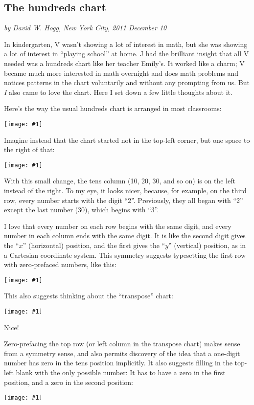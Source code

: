 \documentclass[12pt,pdftex]{article}
\newcommand{\showchart}[1]{\texttt{[image: \#1]}}
\begin{document}
\subsection*{The hundreds chart}

\noindent
\textsl{by David W. Hogg, New York City, 2011 December 10}
\vspace{1ex}

In kindergarten, V wasn't showing a lot of interest in math, but she
was showing a lot of interest in ``playing school'' at home.  J had
the brilliant insight that all V needed was a hundreds chart like her
teacher Emily's.  It worked like a charm; V became much more
interested in math overnight and does math problems and notices
patterns in the chart voluntarily and without any prompting from us.
But \emph{I} also came to love the chart.  Here I set down a few
little thoughts about it.

Here's the way the usual hundreds chart is arranged in most
classrooms:
\begin{center}
\showchart{hundreds_chart_standard.pdf}
\end{center}

Imagine instead that the chart started not in the top-left corner,
but one space to the right of that:
\begin{center}
\showchart{hundreds_chart_skipzero_nzp.pdf}
\end{center}
With this small change, the tens column (10, 20, 30, and so on) is on
the left instead of the right.  To my eye, it looks nicer, because,
for example, on the third row, every number starts with the digit
``2''.  Previously, they all began with ``2'' except the last number
(30), which begins with ``3''.

I love that every number on each row begins with the same digit, and
every number in each column ends with the same digit.  It is like the
second digit gives the ``$x$'' (horizontal) position, and the first
gives the ``$y$'' (vertical) position, as in a Cartesian coordinate
system.  This symmetry suggests typesetting the first row with
zero-prefaced numbers, like this:
\begin{center}
\showchart{hundreds_chart_skipzero.pdf}
\end{center}
This also suggests thinking about the ``transpose'' chart:
\begin{center}
\showchart{hundreds_chart_transpose_skipzero.pdf}
\end{center}
Nice!

Zero-prefacing the top row (or left column in the transpose chart)
makes sense from a symmetry sense, and also permits discovery of the
idea that a one-digit number has zero in the tens position implicitly.
It also suggests filling in the top-left blank with the only possible
number: It has to have a zero in the first position, and a zero in the
second position:
\begin{center}
\showchart{hundreds_chart_default.pdf}
\end{center}
\end{document}
